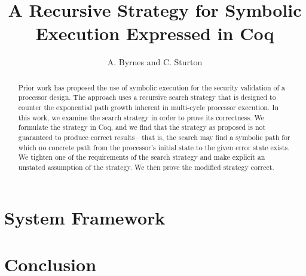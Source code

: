 \documentclass[a4paper]{article}
\title{A Recursive Strategy for Symbolic Execution Expressed in Coq}
\author{A. Byrnes and C. Sturton}
\begin{document}
\maketitle

\begin{abstract}
Prior work has proposed the use of symbolic execution for the security
validation of a processor design. The approach uses a recursive search strategy
that is designed to counter the exponential path growth inherent in multi-cycle
processor execution. In this work, we examine the search strategy in order to prove its correctness. We formulate the
strategy in Coq, and we find that the
strategy as proposed is not guaranteed to produce correct results---that is, the
search may find a symbolic path for which no concrete path from the processor's initial state
to the given error state exists. We tighten one of the requirements of the
search strategy and make explicit an unstated assumption of the strategy. We then prove the modified strategy correct. 
\end{abstract}




\section{System Framework}

\section{Conclusion}






\end{document}
